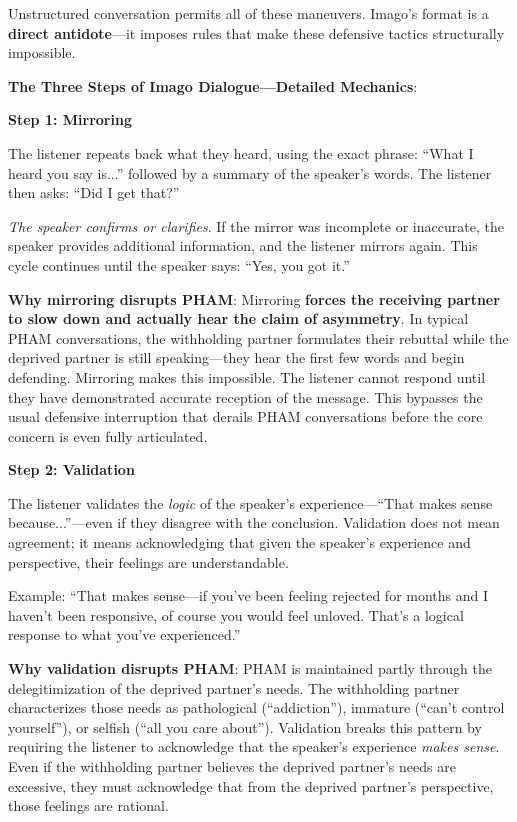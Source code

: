 \documentclass[12pt,openany]{book}
\numberwithin{equation}{chapter}
\begin{document}
Unstructured conversation permits all of these maneuvers. Imago's format is a \textbf{direct antidote}---it imposes rules that make these defensive tactics structurally impossible.

\textbf{The Three Steps of Imago Dialogue---Detailed Mechanics}:

\textbf{Step 1: Mirroring}

The listener repeats back what they heard, using the exact phrase: ``What I heard you say is...'' followed by a summary of the speaker's words. The listener then asks: ``Did I get that?''

\textit{The speaker confirms or clarifies}. If the mirror was incomplete or inaccurate, the speaker provides additional information, and the listener mirrors again. This cycle continues until the speaker says: ``Yes, you got it.''

\textbf{Why mirroring disrupts PHAM}: Mirroring \textbf{forces the receiving partner to slow down and actually hear the claim of asymmetry}. In typical PHAM conversations, the withholding partner formulates their rebuttal while the deprived partner is still speaking---they hear the first few words and begin defending. Mirroring makes this impossible. The listener cannot respond until they have demonstrated accurate reception of the message. This bypasses the usual defensive interruption that derails PHAM conversations before the core concern is even fully articulated.

\textbf{Step 2: Validation}

The listener validates the \textit{logic} of the speaker's experience---``That makes sense because...''---even if they disagree with the conclusion. Validation does not mean agreement; it means acknowledging that given the speaker's experience and perspective, their feelings are understandable.

Example: ``That makes sense---if you've been feeling rejected for months and I haven't been responsive, of course you would feel unloved. That's a logical response to what you've experienced.''

\textbf{Why validation disrupts PHAM}: PHAM is maintained partly through the delegitimization of the deprived partner's needs. The withholding partner characterizes those needs as pathological (``addiction''), immature (``can't control yourself''), or selfish (``all you care about''). Validation breaks this pattern by requiring the listener to acknowledge that the speaker's experience \textit{makes sense}. Even if the withholding partner believes the deprived partner's needs are excessive, they must acknowledge that from the deprived partner's perspective, those feelings are rational.
\end{document}
